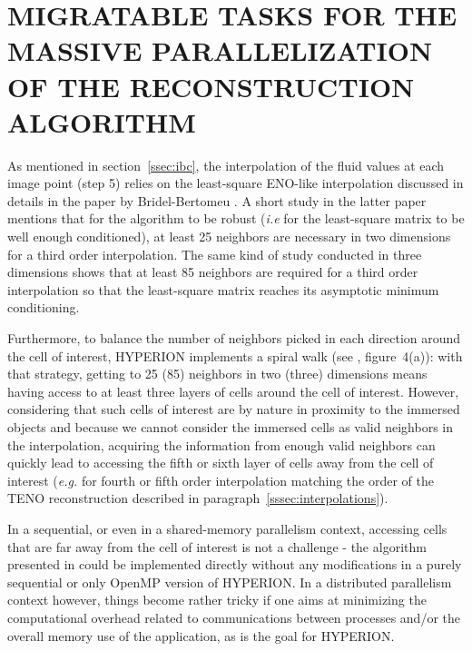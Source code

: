 \section{MIGRATABLE TASKS FOR THE MASSIVE PARALLELIZATION OF THE RECONSTRUCTION ALGORITHM}\label{sec:migratable_tasks}

As mentioned in section~\ref{ssec:ibc}, the interpolation of the fluid values at each image point (step 5) relies on the least-square ENO-like interpolation discussed in details in the paper by Bridel-Bertomeu \cite{BRIDELBERTOMEU2021}.
A short study in the latter paper mentions that for the algorithm to be robust (\emph{i.e} for the least-square matrix to be well enough conditioned), at least 25 neighbors are necessary in two dimensions for a third order interpolation.
The same kind of study conducted in three dimensions shows that at least 85 neighbors are required for a third order interpolation so that the least-square matrix reaches its asymptotic minimum conditioning.

Furthermore, to balance the number of neighbors picked in each direction around the cell of interest, HYPERION implements a spiral walk (see \cite{BRIDELBERTOMEU2021}, figure~4(a)): with that strategy, getting to 25 (85) neighbors in two (three) dimensions means having access to at least three layers of cells around the cell of interest.
However, considering that such cells of interest are by nature in proximity to the immersed objects and because we cannot consider the immersed cells as valid neighbors in the interpolation, acquiring the information from enough valid neighbors can quickly lead to accessing the fifth or sixth layer of cells away from the cell of interest (\emph{e.g.} for fourth or fifth order interpolation matching the order of the TENO reconstruction described in paragraph~\ref{sssec:interpolations}).

In a sequential, or even in a shared-memory parallelism context, accessing cells that are far away from the cell of interest is not a challenge - the algorithm presented in \cite{BRIDELBERTOMEU2021} could be implemented directly without any modifications in a purely sequential or only OpenMP version of HYPERION.
In a distributed parallelism context however, things become rather tricky if one aims at minimizing the computational overhead related to communications between processes and/or the overall memory use of the application, as is the goal for HYPERION.

